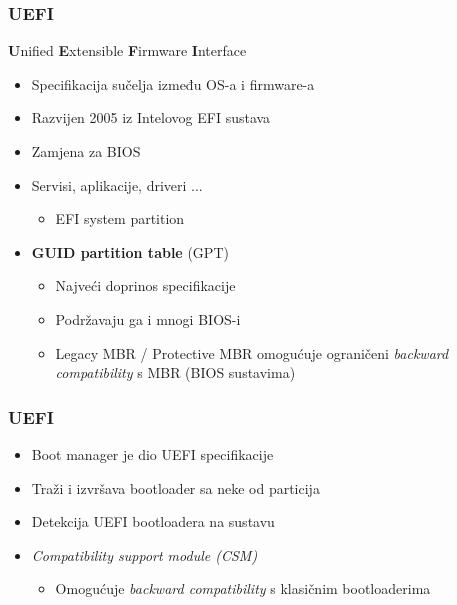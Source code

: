 \documentclass[t]{beamer}
\begin{document}
\begin{frame}
	\frametitle{UEFI}
	\textbf{U}nified \textbf{E}xtensible \textbf{F}irmware \textbf{I}nterface
	\begin{itemize}
		\item Specifikacija sučelja između OS-a i firmware-a
		\item Razvijen 2005 iz Intelovog EFI sustava
		\item Zamjena za BIOS
		\item Servisi, aplikacije, driveri ...
		\begin{itemize}
			\item EFI system partition
		\end{itemize}
	\end{itemize}
	\vfill
	\begin{itemize}
		\item \textbf{GUID partition table} (GPT)
		\begin{itemize}
			\item Najveći doprinos specifikacije
			\item Podržavaju ga i mnogi BIOS-i
			\item Legacy MBR / Protective MBR omogućuje ograničeni \textit{backward compatibility} s MBR (BIOS sustavima)
		\end{itemize}
	\end{itemize}
\end{frame}

\begin{frame}
	\frametitle{UEFI}
	\begin{itemize}
		\item Boot manager je dio UEFI specifikacije
		\item Traži i izvršava bootloader sa neke od particija
		\item Detekcija UEFI bootloadera na sustavu
	\end{itemize}
	\begin{itemize}
		\item \textit{Compatibility support module (CSM)}
		\begin{itemize}
			\item Omogućuje \textit{backward compatibility} s klasičnim bootloaderima
		\end{itemize}
	\end{itemize}
\end{frame}
\end{document}
